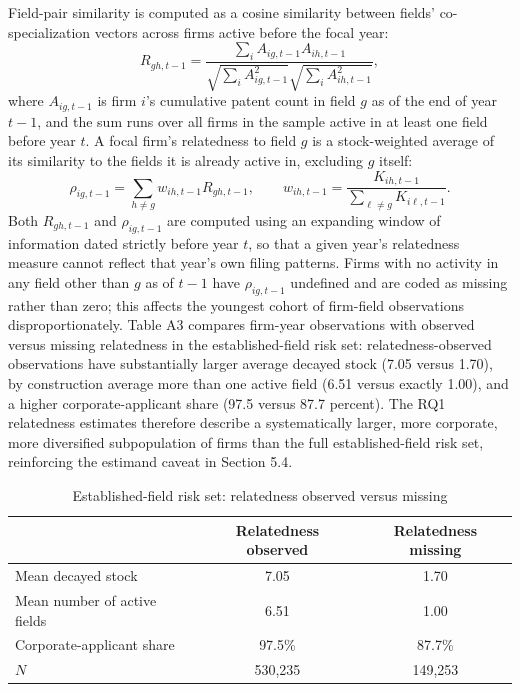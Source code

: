 \documentclass[12pt]{article}
\begin{document}
Field-pair similarity is computed as a cosine similarity between fields' co-specialization vectors across firms active before the focal year:
\begin{equation}
R_{gh,t-1} = \frac{\sum_i A_{ig,t-1} A_{ih,t-1}}{\sqrt{\sum_i A_{ig,t-1}^2}\sqrt{\sum_i A_{ih,t-1}^2}},
\end{equation}
where $A_{ig,t-1}$ is firm $i$'s cumulative patent count in field $g$ as of the end of year $t-1$, and the sum runs over all firms in the sample active in at least one field before year $t$. A focal firm's relatedness to field $g$ is a stock-weighted average of its similarity to the fields it is already active in, excluding $g$ itself:
\begin{equation}
\rho_{ig,t-1} = \sum_{h\neq g} w_{ih,t-1} R_{gh,t-1}, \qquad w_{ih,t-1} = \frac{K_{ih,t-1}}{\sum_{\ell\neq g} K_{i\ell,t-1}}.
\end{equation}
Both $R_{gh,t-1}$ and $\rho_{ig,t-1}$ are computed using an expanding window of information dated strictly before year $t$, so that a given year's relatedness measure cannot reflect that year's own filing patterns. Firms with no activity in any field other than $g$ as of $t-1$ have $\rho_{ig,t-1}$ undefined and are coded as missing rather than zero; this affects the youngest cohort of firm-field observations disproportionately. Table A3 compares firm-year observations with observed versus missing relatedness in the established-field risk set: relatedness-observed observations have substantially larger average decayed stock (7.05 versus 1.70), by construction average more than one active field (6.51 versus exactly 1.00), and a higher corporate-applicant share (97.5 versus 87.7 percent). The RQ1 relatedness estimates therefore describe a systematically larger, more corporate, more diversified subpopulation of firms than the full established-field risk set, reinforcing the estimand caveat in Section 5.4.

\begin{table}[htbp]
\centering
\small
\caption{Established-field risk set: relatedness observed versus missing}
\label{tab:appendixA3}
\begin{tabular}{lcc}
\toprule
 & Relatedness observed & Relatedness missing \\
\midrule
Mean decayed stock & 7.05 & 1.70 \\
Mean number of active fields & 6.51 & 1.00 \\
Corporate-applicant share & 97.5\% & 87.7\% \\
$N$ & 530{,}235 & 149{,}253 \\
\bottomrule
\end{tabular}
\end{table}
\end{document}
